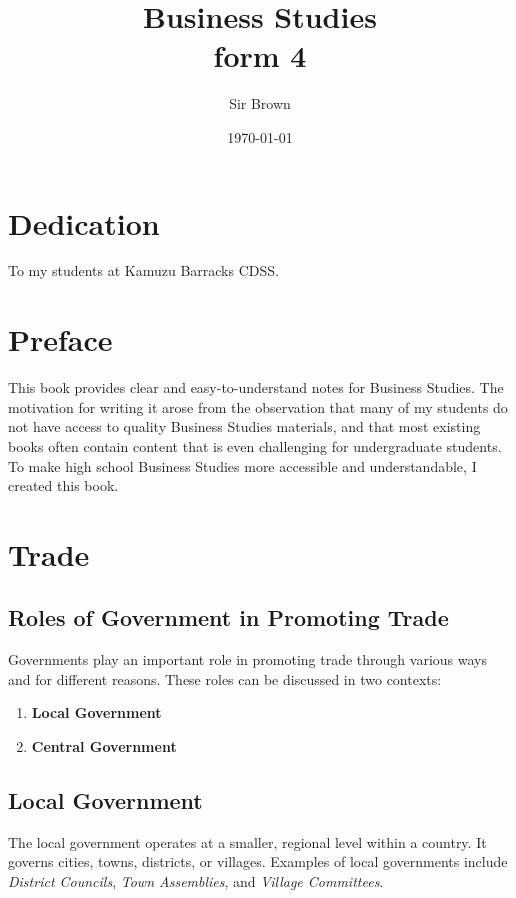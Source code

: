 \documentclass[12pt,a4paper, openany]{book}
\begin{document}
\frontmatter
\title{Business Studies \\ form 4}
\author{Sir Brown}
\date{\today}

\maketitle

\chapter*{Dedication}
To my students at Kamuzu Barracks CDSS.

\chapter*{Preface}
This book provides clear and easy-to-understand notes for Business Studies.
The motivation for writing it arose from the observation that many of my students
do not have access to quality Business Studies materials, and that most existing
books often contain content that is even challenging for undergraduate students.
To make high school Business Studies more accessible and understandable,
I created this book.

\tableofcontents

\mainmatter
\chapter{Trade}
\section{Roles of Government in Promoting Trade}
Governments play an important role in promoting trade through various ways and for different reasons.
These roles can be discussed in two contexts:
\begin{enumerate}
	\item \textbf{Local Government}
	\item \textbf{Central Government}
\end{enumerate}

\section{Local Government}
The local government operates at a smaller, regional level within a country.
It governs cities, towns, districts, or villages.
Examples of local governments include \textit{District Councils}, \textit{Town Assemblies}, and \textit{Village Committees}.
\end{document}
